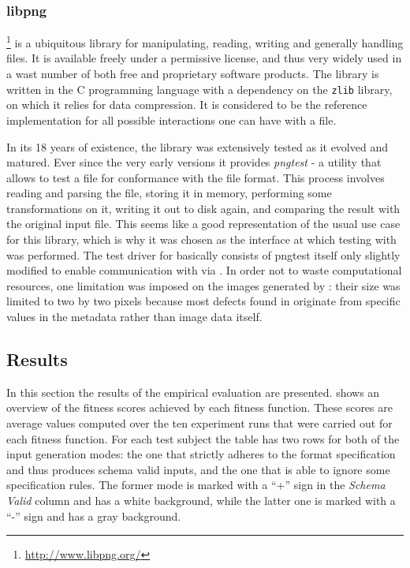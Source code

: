 \tocless\subsubsection{libpng}
\libpng\footnote{\url{http://www.libpng.org/}} is a ubiquitous library for manipulating, reading,
writing and generally handling \png files. It is available freely under a permissive license, and thus very
widely used in a wast number of both free and proprietary software products. The \libpng library is
written in the {\small C} programming language with a dependency on the \texttt{zlib} library, on which it
relies for data compression. It is considered to be the reference implementation for all possible interactions
one can have with a \png file.

In its 18 years of existence, the library was extensively tested as it evolved and matured. Ever since the very
early versions it provides \emph{pngtest} - a utility that allows to test a \png file for conformance with the
\png file format. This process involves reading and parsing the file, storing it in memory, performing some
transformations on it, writing it out to disk again, and comparing the result with the original input file.
This seems like a good representation of the usual use case for this library, which is why it was chosen as
the interface at which testing with \xmlmate was performed. The test driver for \libpng basically
consists of pngtest itself only slightly modified to enable communication with \xmlmate via \zmq. In order not
to waste computational resources, one limitation was imposed on the images generated by \xmlmate: their size
was limited to two by two pixels because most defects found in \libpng originate from specific values
in the metadata rather than image data itself.

\subsection{Results}
In this section the results of the empirical evaluation are presented.  shows an overview of
the fitness scores achieved by each fitness function. These scores are average values computed over the ten
experiment runs that were carried out for each fitness function. For each test subject the table has two rows
for both of the input generation modes: the one that strictly adheres to the format specification and thus
produces schema valid inputs, and the one that is able to ignore some specification rules. The former mode is
marked with a ``+'' sign in the \emph{Schema Valid} column and has a white background, while the latter one is
marked with a ``-'' sign and has a gray background.

